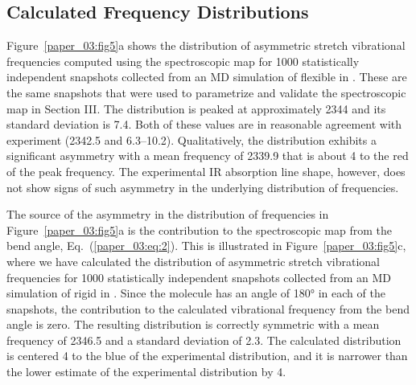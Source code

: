 \subsection{Calculated Frequency Distributions}
\label{paper_03:ssec:V-B}

Figure~\ref{paper_03:fig5}a shows the distribution of  asymmetric stretch vibrational frequencies computed using the spectroscopic map for 1000 statistically independent snapshots collected from an MD simulation of flexible  in \ce{[C4C1im][PF6]}. These are the same snapshots that were used to parametrize and validate the spectroscopic map in Section III. The distribution is peaked at approximately \SI{2344}{\wavenumber} and its standard deviation is \SI{7.4}{\wavenumber}. Both of these values are in reasonable agreement with experiment (\SI{2342.5}{\wavenumber} and \SIrange{6.3}{10.2}{\wavenumber}). Qualitatively, the distribution exhibits a significant asymmetry with a mean frequency of \SI{2339.9}{\wavenumber} that is about \SI{4}{\wavenumber} to the red of the peak frequency. The experimental IR absorption line shape, however, does not show signs of such asymmetry in the underlying distribution of frequencies.

The source of the asymmetry in the distribution of frequencies in Figure~\ref{paper_03:fig5}a is the contribution to the spectroscopic map from the  bend angle, Eq.~(\ref{paper_03:eq:2}). This is illustrated in Figure~\ref{paper_03:fig5}c, where we have calculated the distribution of  asymmetric stretch vibrational frequencies for 1000 statistically independent snapshots collected from an MD simulation of rigid  in \ce{[C4C1im][PF6]}. Since the  molecule has an angle of \ang{180} in each of the snapshots, the contribution to the calculated vibrational frequency from the  bend angle is zero. The resulting distribution is correctly symmetric with a mean frequency of \SI{2346.5}{\wavenumber} and a standard deviation of \SI{2.3}{\wavenumber}. The calculated distribution is centered \SI{4}{\wavenumber} to the blue of the experimental distribution, and it is narrower than the lower estimate of the experimental distribution by \SI{4}{\wavenumber}.

